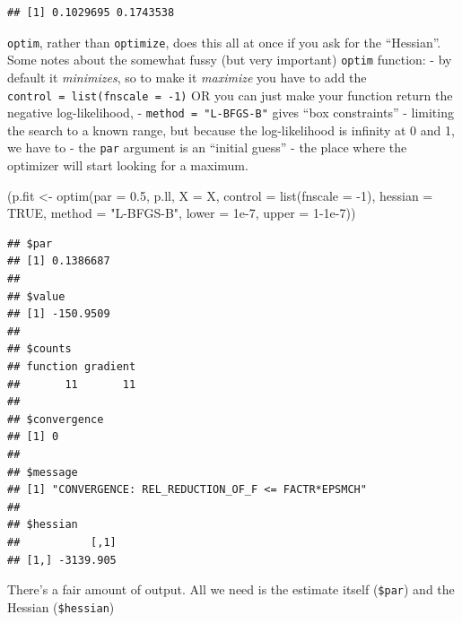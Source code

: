 \documentclass[]{tufte-handout}
\newenvironment{Shaded}{}{}
\newcommand{\AttributeTok}[1]{\textcolor[rgb]{0.49,0.56,0.16}{#1}}
\newcommand{\ConstantTok}[1]{\textcolor[rgb]{0.53,0.00,0.00}{#1}}
\newcommand{\DecValTok}[1]{\textcolor[rgb]{0.25,0.63,0.44}{#1}}
\newcommand{\FloatTok}[1]{\textcolor[rgb]{0.25,0.63,0.44}{#1}}
\newcommand{\FunctionTok}[1]{\textcolor[rgb]{0.02,0.16,0.49}{#1}}
\newcommand{\NormalTok}[1]{#1}
\newcommand{\OtherTok}[1]{\textcolor[rgb]{0.00,0.44,0.13}{#1}}
\newcommand{\SpecialCharTok}[1]{\textcolor[rgb]{0.25,0.44,0.63}{#1}}
\newcommand{\StringTok}[1]{\textcolor[rgb]{0.25,0.44,0.63}{#1}}
\begin{document}
\begin{verbatim}
## [1] 0.1029695 0.1743538
\end{verbatim}

\texttt{optim}, rather than \texttt{optimize}, does this all at once if
you ask for the ``Hessian''. Some notes about the somewhat fussy (but
very important) \texttt{optim} function: - by default it
\emph{minimizes}, so to make it \emph{maximize} you have to add the
\texttt{control\ =\ list(fnscale\ =\ -1)} OR you can just make your
function return the negative log-likelihood, -
\texttt{method\ =\ "L-BFGS-B"} gives ``box constraints'' - limiting the
search to a known range, but because the log-likelihood is infinity at 0
and 1, we have to - the \texttt{par} argument is an ``initial guess'' -
the place where the optimizer will start looking for a maximum.

\begin{Shaded}
\begin{Highlighting}[]
\NormalTok{(p.fit }\OtherTok{\textless{}{-}} \FunctionTok{optim}\NormalTok{(}\AttributeTok{par =} \FloatTok{0.5}\NormalTok{, p.ll, }\AttributeTok{X =}\NormalTok{ X, }
      \AttributeTok{control =} \FunctionTok{list}\NormalTok{(}\AttributeTok{fnscale =} \SpecialCharTok{{-}}\DecValTok{1}\NormalTok{), }
      \AttributeTok{hessian =} \ConstantTok{TRUE}\NormalTok{, }\AttributeTok{method =} \StringTok{"L{-}BFGS{-}B"}\NormalTok{, }
      \AttributeTok{lower =} \FloatTok{1e{-}7}\NormalTok{, }\AttributeTok{upper =} \DecValTok{1}\FloatTok{{-}1e{-}7}\NormalTok{))}
\end{Highlighting}
\end{Shaded}

\begin{verbatim}
## $par
## [1] 0.1386687
## 
## $value
## [1] -150.9509
## 
## $counts
## function gradient 
##       11       11 
## 
## $convergence
## [1] 0
## 
## $message
## [1] "CONVERGENCE: REL_REDUCTION_OF_F <= FACTR*EPSMCH"
## 
## $hessian
##           [,1]
## [1,] -3139.905
\end{verbatim}

There's a fair amount of output. All we need is the estimate itself
(\texttt{\$par}) and the Hessian (\texttt{\$hessian})

\begin{Shaded}
\end{Shaded}
\end{document}
